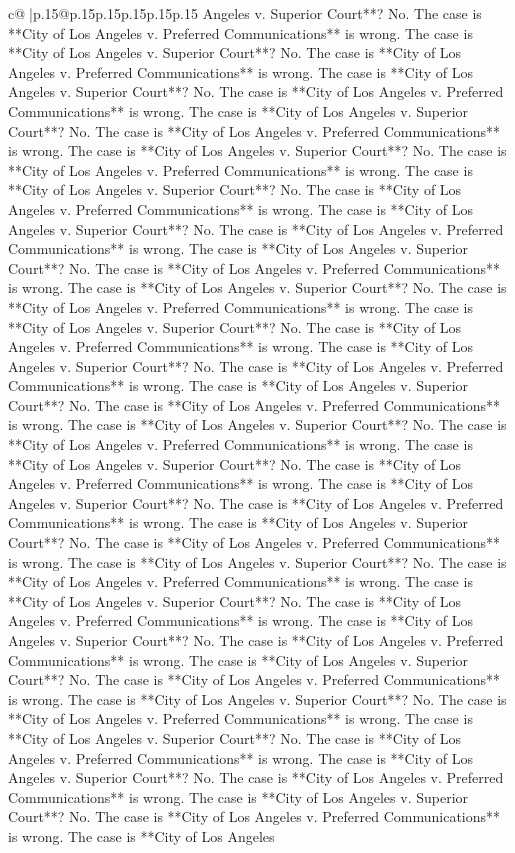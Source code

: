 \documentclass{article}
\begin{document}
{\begin{supertabular}{c@{$\;$}|p{.15\linewidth}@{}p{.15\linewidth}p{.15\linewidth}p{.15\linewidth}p{.15\linewidth}p{.15\linewidth}}
{{{Angeles v. Superior Court**? No. The case is **City of Los Angeles v. Preferred Communications** is wrong. The case is **City of Los Angeles v. Superior Court**? No. The case is **City of Los Angeles v. Preferred Communications** is wrong. The case is **City of Los Angeles v. Superior Court**? No. The case is **City of Los Angeles v. Preferred Communications** is wrong. The case is **City of Los Angeles v. Superior Court**? No. The case is **City of Los Angeles v. Preferred Communications** is wrong. The case is **City of Los Angeles v. Superior Court**? No. The case is **City of Los Angeles v. Preferred Communications** is wrong. The case is **City of Los Angeles v. Superior Court**? No. The case is **City of Los Angeles v. Preferred Communications** is wrong. The case is **City of Los Angeles v. Superior Court**? No. The case is **City of Los Angeles v. Preferred Communications** is wrong. The case is **City of Los Angeles v. Superior Court**? No. The case is **City of Los Angeles v. Preferred Communications** is wrong. The case is **City of Los Angeles v. Superior Court**? No. The case is **City of Los Angeles v. Preferred Communications** is wrong. The case is **City of Los Angeles v. Superior Court**? No. The case is **City of Los Angeles v. Preferred Communications** is wrong. The case is **City of Los Angeles v. Superior Court**? No. The case is **City of Los Angeles v. Preferred Communications** is wrong. The case is **City of Los Angeles v. Superior Court**? No. The case is **City of Los Angeles v. Preferred Communications** is wrong. The case is **City of Los Angeles v. Superior Court**? No. The case is **City of Los Angeles v. Preferred Communications** is wrong. The case is **City of Los Angeles v. Superior Court**? No. The case is **City of Los Angeles v. Preferred Communications** is wrong. The case is **City of Los Angeles v. Superior Court**? No. The case is **City of Los Angeles v. Preferred Communications** is wrong. The case is **City of Los Angeles v. Superior Court**? No. The case is **City of Los Angeles v. Preferred Communications** is wrong. The case is **City of Los Angeles v. Superior Court**? No. The case is **City of Los Angeles v. Preferred Communications** is wrong. The case is **City of Los Angeles v. Superior Court**? No. The case is **City of Los Angeles v. Preferred Communications** is wrong. The case is **City of Los Angeles v. Superior Court**? No. The case is **City of Los Angeles v. Preferred Communications** is wrong. The case is **City of Los Angeles v. Superior Court**? No. The case is **City of Los Angeles v. Preferred Communications** is wrong. The case is **City of Los Angeles v. Superior Court**? No. The case is **City of Los Angeles v. Preferred Communications** is wrong. The case is **City of Los Angeles v. Superior Court**? No. The case is **City of Los Angeles v. Preferred Communications** is wrong. The case is **City of Los Angeles v. Superior Court**? No. The case is **City of Los Angeles v. Preferred Communications** is wrong. The case is **City of Los Angeles v. Superior Court**? No. The case is **City of Los Angeles v. Preferred Communications** is wrong. The case is **City of Los Angeles }}}
\end{supertabular}}
\end{document}
